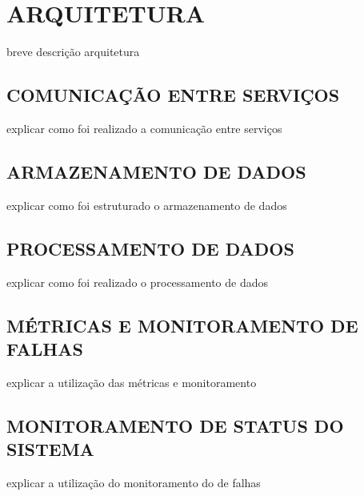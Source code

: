 \chapter{ARQUITETURA}
\label{chp:arquitetura}

breve descrição arquitetura

\section{COMUNICAÇÃO ENTRE SERVIÇOS}

explicar como foi realizado a comunicação entre serviços

\section{ARMAZENAMENTO DE DADOS}

explicar como foi estruturado o armazenamento de dados

\section{PROCESSAMENTO DE DADOS}

explicar como foi realizado o processamento de dados

\section{MÉTRICAS E MONITORAMENTO DE FALHAS}

explicar a utilização das métricas e monitoramento

\section{MONITORAMENTO DE STATUS DO SISTEMA}

explicar a utilização do monitoramento do de falhas
